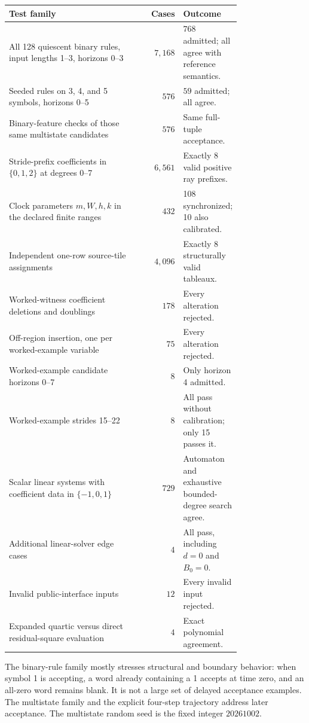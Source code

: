 \documentclass[11pt,letterpaper]{article}
\numberwithin{equation}{section}
\theoremstyle{definition}
\begin{document}
\begin{longtable}{@{}P{0.56\linewidth}r P{0.21\linewidth}@{}}
\toprule
Test family & Cases & Outcome\\
\midrule
\endhead
All 128 quiescent binary rules, input lengths 1--3, horizons 0--3
 & $7{,}168$ & $768$ admitted; all agree with reference semantics.\\
Seeded rules on 3, 4, and 5 symbols, horizons 0--5
 & $576$ & $59$ admitted; all agree.\\
Binary-feature checks of those same multistate candidates
 & $576$ & Same full-tuple acceptance.\\
Stride-prefix coefficients in $\{0,1,2\}$ at degrees 0--7
 & $6{,}561$ & Exactly 8 valid positive ray prefixes.\\
Clock parameters $m,W,h,k$ in the declared finite ranges
 & $432$ & 108 synchronized; 10 also calibrated.\\
Independent one-row source-tile assignments
 & $4{,}096$ & Exactly 8 structurally valid tableaux.\\
Worked-witness coefficient deletions and doublings
 & $178$ & Every alteration rejected.\\
Off-region insertion, one per worked-example variable
 & $75$ & Every alteration rejected.\\
Worked-example candidate horizons 0--7
 & $8$ & Only horizon 4 admitted.\\
Worked-example strides 15--22
 & $8$ & All pass without calibration; only 15 passes it.\\
Scalar linear systems with coefficient data in $\{-1,0,1\}$
 & $729$ & Automaton and exhaustive bounded-degree search agree.\\
Additional linear-solver edge cases
 & $4$ & All pass, including $d=0$ and $B_0=0$.\\
Invalid public-interface inputs
 & $12$ & Every invalid input rejected.\\
Expanded quartic versus direct residual-square evaluation
 & $4$ & Exact polynomial agreement.\\
\bottomrule
\end{longtable}

The binary-rule family mostly stresses structural and boundary behavior:
when symbol 1 is accepting, a word already containing a 1 accepts at time
zero, and an all-zero word remains blank. It is not a large set of delayed
acceptance examples. The multistate family and the explicit four-step
trajectory address later acceptance. The multistate random seed is the
fixed integer $20261002$.
\end{document}
